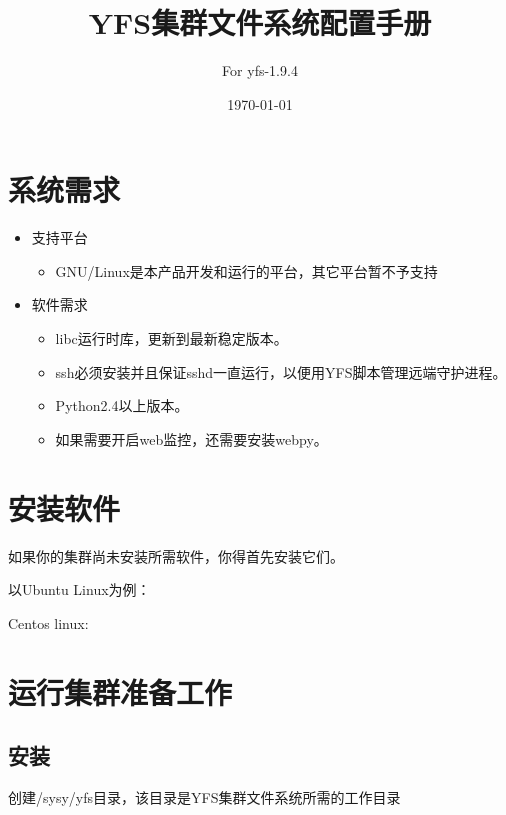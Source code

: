 \documentclass[11pt]{article}
\title{YFS集群文件系统配置手册}
\author{For yfs-1.9.4}
\date{\today}
\newcommand{\shellcmd}[1] {
\fbox{
\begin{minipage}{12cm}
\textcolor{black}{#1}
\end{minipage}}
\newline
}
\begin{document}
\begin{CJK}{UTF8}{song}

\maketitle
\tableofcontents 

\newpage
\section{系统需求}
\begin{itemize}
  \item 支持平台
    \begin{itemize}
      \item GNU/Linux是本产品开发和运行的平台，其它平台暂不予支持
    \end{itemize}
  \item 软件需求
    \begin{itemize}
      \item libc运行时库，更新到最新稳定版本。
      \item ssh必须安装并且保证sshd一直运行，以便用YFS脚本管理远端守护进程。
      \item Python2.4以上版本。
      \item 如果需要开启web监控，还需要安装webpy。
    \end{itemize}
\end{itemize}

\section{安装软件}
\noindent 如果你的集群尚未安装所需软件，你得首先安装它们。

\noindent 以Ubuntu Linux为例：\\
\shellcmd{\$ sudo apt-get install openssh-server openssh-client}

\noindent Centos linux:\\
\shellcmd{\$ yum install openssh-server openssh-client}

\section{运行集群准备工作}
\subsection{安装}
\noindent 创建/sysy/yfs目录，该目录是YFS集群文件系统所需的工作目录\\
\shellcmd{\$ mkdir -p /sysy/yfs}


\end{CJK}
\end{document}
